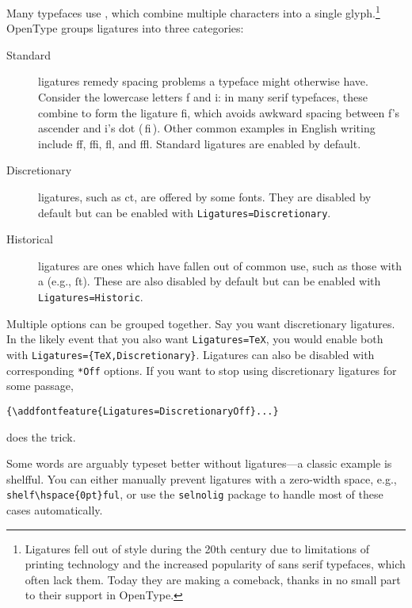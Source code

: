 Many typefaces use , which combine multiple characters
into a single glyph.\punckern\footnote{Ligatures fell out
of style during the 20{th}
century due to limitations of printing technology and the increased popularity
of sans serif typefaces, which often lack them.
Today they are making a comeback,
thanks in no small part to their support in OpenType.}
OpenType groups ligatures into three categories:
\begin{description}
\item[Standard] ligatures remedy spacing problems a typeface might otherwise have.
    Consider the lowercase letters f and i: in many serif typefaces,
    these combine to form the ligature fi,
    which avoids awkward spacing between f's ascender and i's dot
    { (\,fi\,)}.
    Other common examples in English writing include ff,
    ffi, fl, and ffl.
    Standard ligatures are enabled by default.
\item[Discretionary] ligatures, such as
    {ct},
    are offered by some fonts.
    They are disabled by default
    but can be enabled with
    \verb|Ligatures=Discretionary|.
\item[Historical] ligatures are ones which have fallen out of common use,
    such as those with a  (e.g., ſt).
    These are also disabled by default
    but can be enabled with \verb|Ligatures=Historic|.
\end{description}
Multiple options can be grouped together.
Say you want discretionary ligatures.
In the likely event that you also want \verb|Ligatures=TeX|,
you would enable both with
\verb|Ligatures={TeX,Discretionary}|.
Ligatures can also be disabled with corresponding \verb|*Off|
options. If you want to stop using discretionary ligatures for some passage,
\begin{leftfigure}
\begin{lstlisting}
{\addfontfeature{Ligatures=DiscretionaryOff}...}
\end{lstlisting}
\end{leftfigure}
does the trick.

Some words are arguably typeset better without ligatures---a classic example
is shelfful.\punckern{}
You can either manually prevent ligatures with a zero-width
space, e.g., \verb|shelf\hspace{0pt}ful|,
or use the \texttt{selnolig} package to handle most of these cases automatically.

